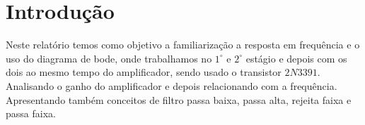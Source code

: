 \chapter*[Introdu\c{c}\~{a}o]{Introdu\c{c}\~{a}o}

	Neste relatório temos como objetivo a familiarização a resposta em frequência e o uso do diagrama de bode, onde trabalhamos no $ 1^\circ $ e $ 2^\circ $ estágio e depois com os dois ao mesmo tempo do amplificador, sendo usado o transistor $ 2N3391 $. Analisando o ganho do amplificador e depois relacionando com a frequência. Apresentando também conceitos de filtro passa baixa, passa alta, rejeita faixa e passa faixa.